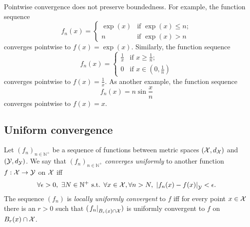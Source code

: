 \begin{exm}
  \label{exm:pointwiseConvergencePreservesNoBoundedness}
  Pointwise convergence does not preserve boundedness.
  For example, the function sequence
  \begin{equation}
    \label{eq:choppedExp}
    f_n(x) =
    \begin{cases}
      \exp(x) & \text{if } \exp(x)\le n;
      \\
      n & \text{if } \exp(x)>n
    \end{cases}
  \end{equation}
  converges pointwise to $f(x)=\exp(x)$. %
  Similarly, the function sequence
  \begin{equation}
    \label{eq:choppedReciprocal}
    f_n(x) =
    \begin{cases}
      \frac{1}{x} & \text{if } x \ge \frac{1}{n};
      \\
      0 & \text{if } x\in (0,\frac{1}{n})
    \end{cases}
  \end{equation}
  converges pointwise to $f(x)=\frac{1}{x}$.
  As another example, the function sequence 
  \begin{equation}
    \label{eq:nSin}
    f_n(x) = n\sin \frac{x}{n}
  \end{equation}
  converges pointwise to $f(x)=x$.
\end{exm}

\subsection{Uniform convergence} %
\label{sec:uniformConvergence}

\begin{defn}
  \label{def:uniformConvergence}
  Let $(f_n)_{n\in\mathbb{N}^+}$ be a sequence of functions
   between metric spaces $({\cal X}, d_{{\cal X}})$
   and $({\cal Y}, d_{{\cal Y}})$.
  We say that $(f_n)_{n\in\mathbb{N}^+}$ \emph{converges uniformly}
  to another function $f:{\cal X}\rightarrow{\cal Y}$
  on ${\cal X}$ iff
   \begin{equation}
     \label{eq:uniformConvergence}
     \forall \epsilon>0,\ 
     \exists N\in \mathbb{N}^+ \text{ s.t. }
     \forall x\in {\cal X}, \forall n>N, \ 
     \left|f_n(x)- f(x)\right|_{{\cal Y}} < \epsilon.
   \end{equation}
  The sequence $(f_n)$ is \emph{locally uniformly convergent} to $f$
   iff for every point $x\in {\cal X}$
   there is an $r>0$
   such that $(\left. f_n\right|_{B_r(x)\cap {\cal X}})$ is
   uniformly convergent to $f$ on $B_r(x)\cap {\cal X}$.
\end{defn}

